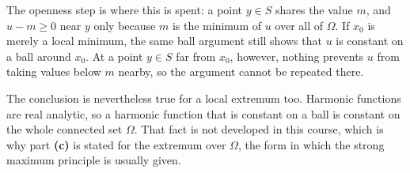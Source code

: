 \begin{exercisesolution}
\begin{remark}
\label{rem:strong_maximum_principle_local_extremum}
The openness step is where this is spent: a point $y \in S$ shares the value $m$, and
$u - m \geq 0$ near $y$ only because $m$ is the minimum of $u$ over all of $\Omega$. If $x_0$ is
merely a local minimum, the same ball argument still shows that $u$ is constant on a ball around
$x_0$. At a point $y \in S$ far from $x_0$, however, nothing prevents $u$ from taking values below
$m$ nearby, so the argument cannot be repeated there.

The conclusion is nevertheless true for a local extremum too. Harmonic functions are real
analytic, so a harmonic function that is constant on a ball is constant on the whole connected
set $\Omega$. That fact is not developed in this course, which is why part \textbf{(c)} is stated
for the extremum over $\Omega$, the form in which the strong maximum principle is usually given.
\end{remark}
\end{exercisesolution}

